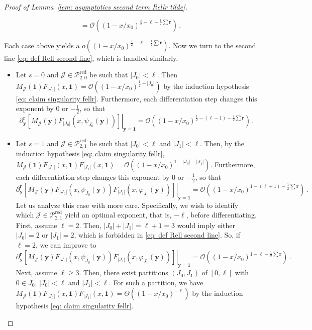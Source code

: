 \documentclass{article}
\theoremstyle{remark}
\newcommand{\cO}{\mathcal{O}}
\newcommand{\abs}[1]{{\left|#1\right|}}
\newcommand{\cJ}{\mathcal{J}}
\newcommand{\cP}{\mathcal{P}}
\newcommand{\by}{{\mathbf{y}}}
\newcommand{\br}{{\mathbf{r}}}
\newcommand{\red}{\mathrm{red}}
\begin{document}
\begin{proof}[Proof of Lemma~\ref{lem: asymptotics second term Rellr tilde}]
\begin{itemize}
\[        = \cO\left( (1-x/x_0)^{\frac{s}{2}-\ell-\frac12\sum\br} \right) \,.
    \]
\end{itemize}
Each case above yields a $o\left( (1-x/x_0)^{\frac12-\ell-\frac12\sum\br} \right)$.
Now we turn to the second line \eqref{eq: def Rell second line}, which is handled similarly.
\begin{itemize}
    \item Let $s=0$ and $\cJ\in\cP_{2,0}^\red$ be such that $\abs{J_0}<\ell$.
    Then $M_\cJ(\bm{1}) F_{\abs{J_0}}(x,\bm{1}) = \cO\left( (1-x/x_0)^{\frac12-\abs{J_0}} \right)$ by the induction hypothesis \eqref{eq: claim singularity fellr}.
    Furthermore, each differentiation step changes this exponent by $0$ or $-\frac12$, so that
    \[
        \partial_\by^\br \left. \left[ M_\cJ(\by) F_{\abs{J_0}}\left( x,\psi_{J_0}(\by) \right) \right] \right\vert_{\by=\bm{1}} 
        = \cO\left( (1-x/x_0)^{\frac12-(\ell-1)-\frac12\sum\br} \right) \,.
    \]
    \item Let $s=1$ and $\cJ\in\cP_{2,1}^\red$ be such that $\abs{J_0}<\ell$ and $\abs{J_1}<\ell$.
    Then, by the induction hypothesis \eqref{eq: claim singularity fellr}, $M_\cJ(\bm{1}) F_{\abs{J_0}}(x,\bm{1}) F_{\abs{J_1}}(x,\bm{1}) = \cO\left( (1-x/x_0)^{1-\abs{J_0}-\abs{J_1}} \right)$.
    Furthermore, each differentiation step changes this exponent by $0$ or $-\frac12$, so that
    \[
        \partial_\by^\br \left. \left[ M_\cJ(\by) F_{\abs{J_0}}\left( x,\psi_{J_0}(\by) \right) F_{\abs{J_1}}\left( x,\varphi_{J_1}(\by) \right) \right] \right\vert_{\by=\bm{1}} 
        = \cO\left( (1-x/x_0)^{1-(\ell+1)-\frac12\sum\br} \right) \,.
    \]
    Let us analyze this case with more care.
    Specifically, we wish to identify which $\cJ\in\cP_{2,1}^\red$ yield an optimal exponent, that is, $-\ell$, before differentiating.
    First, assume $\ell=2$.
    Then, $\abs{J_0}+\abs{J_1} = \ell+1 = 3$ would imply either $\abs{J_0}=2$ or $\abs{J_1}=2$, which is forbidden in \eqref{eq: def Rell second line}.
    So, if $\ell=2$, we can improve to
    \[
        \partial_\by^\br \left. \left[ M_\cJ(\by) F_{\abs{J_0}}\left( x,\psi_{J_0}(\by) \right) F_{\abs{J_1}}\left( x,\varphi_{J_1}(\by) \right) \right] \right\vert_{\by=\bm{1}} 
        = \cO\left( (1-x/x_0)^{1-\ell-\frac12\sum\br} \right) \,.
    \]
    Next, assume $\ell\ge3$.
    Then, there exist partitions $(J_0,J_1)$ of $[0,\ell]$ with $0\in J_0$, $\abs{J_0}<\ell$ and $\abs{J_1}<\ell$.
    For such a partition, we have $M_\cJ(\bm{1}) F_{\abs{J_0}}(x,\bm{1}) F_{\abs{J_1}}(x,\bm{1}) = \Theta\left( (1-x/x_0)^{-\ell} \right)$ by the induction hypothesis \eqref{eq: claim singularity fellr}.

\end{itemize}
\end{proof}
\end{document}

